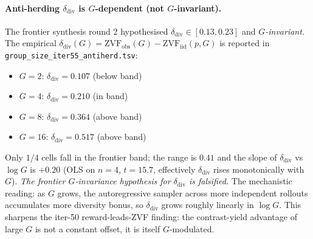 \paragraph{Anti-herding $\delta_{\mathrm{div}}$ is $G$-dependent (not $G$-invariant).}
The frontier synthesis round 2 hypothesised
$\delta_{\mathrm{div}} \in [0.13, 0.23]$ and \emph{$G$-invariant}.
The empirical $\delta_{\mathrm{div}}(G) = \mathrm{ZVF}_{\mathrm{obs}}(G)
- \mathrm{ZVF}_{\mathrm{iid}}(p, G)$ is reported in
\texttt{group\_size\_iter55\_antiherd.tsv}:
\begin{itemize}
  \item $G{=}2$: $\delta_{\mathrm{div}} = 0.107$ (below band)
  \item $G{=}4$: $\delta_{\mathrm{div}} = 0.210$ (in band)
  \item $G{=}8$: $\delta_{\mathrm{div}} = 0.364$ (above band)
  \item $G{=}16$: $\delta_{\mathrm{div}} = 0.517$ (above band)
\end{itemize}
Only $1/4$ cells fall in the frontier band; the range is $0.41$
and the slope of $\delta_{\mathrm{div}}$ vs $\log G$ is
$+0.20$ (OLS on $n{=}4$, $t{=}15.7$, effectively $\delta_{\mathrm{div}}$
rises monotonically with $G$).  \emph{The frontier
$G$-invariance hypothesis for $\delta_{\mathrm{div}}$ is falsified.}
The mechanistic reading: as $G$ grows, the autoregressive sampler
across more independent rollouts accumulates more diversity
bonus, so $\delta_{\mathrm{div}}$ grows roughly linearly in
$\log G$.  This sharpens the iter-50 reward-leads-ZVF finding: the
contrast-yield advantage of large $G$ is not a constant
offset, it is itself $G$-modulated.


